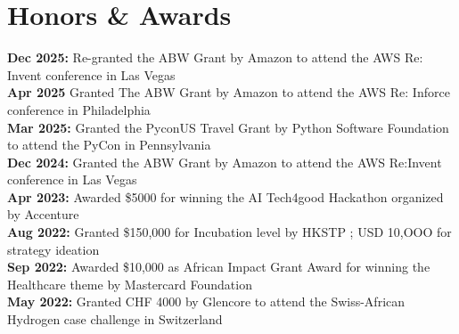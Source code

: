 \documentclass[letterpaper,11pt]{article}
\begin{document}
\section{Honors \& Awards}
 \begin{itemize}[leftmargin=0.15in, label={}]
    \small{\item{
     \textbf{Dec 2025:} Re-granted the ABW Grant by Amazon to attend the AWS Re: Invent conference in Las Vegas\\
      \textbf{Apr 2025} Granted The ABW Grant by Amazon to attend the AWS Re: Inforce conference in Philadelphia\\
     \textbf{Mar 2025:} Granted the PyconUS Travel Grant by Python Software Foundation to attend the PyCon in Pennsylvania\\
     \textbf{Dec 2024:} Granted the ABW Grant by Amazon to attend the AWS Re:Invent conference in Las Vegas\\
     \textbf{Apr 2023:} Awarded \$5000 for winning the AI Tech4good Hackathon organized by Accenture\\
     \textbf{Aug 2022:} Granted \$150,000 for Incubation level by HKSTP ; USD 10,OOO for strategy ideation\\
     \textbf{Sep 2022:} Awarded \$10,000 as African Impact Grant Award for winning the Healthcare theme by Mastercard Foundation\\
     \textbf{May 2022:} Granted CHF 4000 by Glencore to attend the Swiss-African Hydrogen case challenge in Switzerland
    }}
 \end{itemize}
\end{document}
